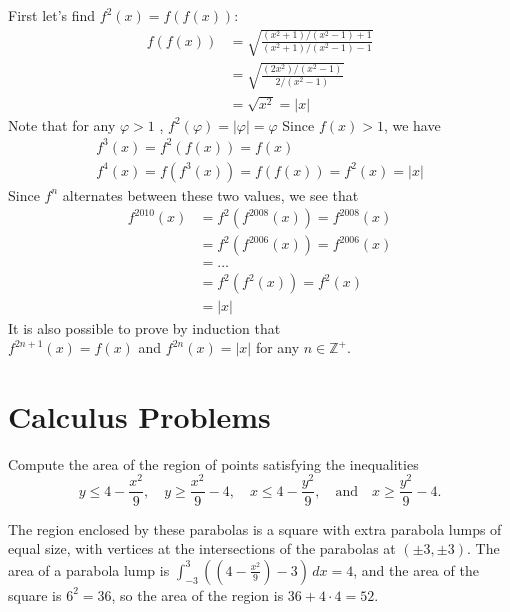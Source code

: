 \documentclass[12pt]{article}
\newcounter{problem}
\begin{document}
\begin{solution}[B]
      First let's find $f^2(x) = f(f(x))$:
      \begin{align*}
         f(f(x)) &= \sqrt{ \frac{ (x^2+1)/(x^2-1)+1 } { (x^2+1)/(x^2-1) -1} } \\
         &= \sqrt{ \frac{ (2x^2)/(x^2-1) }{ 2/(x^2-1) } } \\
         &= \sqrt{x^2} = |x|
      \end{align*}
      Note that for any $\varphi>1$ ,  $f^2(\varphi) = |\varphi| = \varphi$
      Since $f(x)>1$, we have \\
      \begin{align*}
         f^3(x)=f^2(f(x)) = f(x) \\
         f^4(x) = f(f^3(x)) = f(f(x)) = f^2(x) = |x|
      \end{align*}
      Since $f^n$ alternates between these two values, we see that
      \begin{align*}
         f^{2010}(x) &= f^2(f^{2008}(x)) = f^{2008}(x)\\
         &= f^2(f^{2006}(x)) = f^{2006}(x) \\
         &= \ldots \\
         &= f^2(f^2(x)) = f^2(x) \\
         &= \boxed{|x|}
      \end{align*}
      It is also possible to prove by induction that \\
      $f^{2n+1}(x) = f(x)$ and $f^{2n}(x)=|x|$ for any $n \in \mathbb{Z}^{+}$.
\end{solution}

\newpage

\section*{Calculus Problems}

\begin{problem}[D][4][BMT 2021/4]
   Compute the area of the region of points satisfying the inequalities 
\[ y \leq 4 - \frac{x^2}{9}, \quad y \geq \frac{x^2}{9} - 4, \quad x \leq 4 - \frac{y^2}{9}, \quad \text{and} \quad x \geq \frac{y^2}{9} - 4. \]
\end{problem}

\vspace{-1.5cm}

\begin{solution}[52]
   The region enclosed by these parabolas is a square with extra parabola lumps of equal size, with vertices at the intersections of the parabolas at \((\pm 3, \pm 3)\). The area of a parabola lump is \(\int_{-3}^{3} \left( \left(4 - \frac{x^2}{9}\right) - 3 \right) \, dx = 4\), and the area of the square is \(6^2 = 36\), so the area of the region is $36 + 4 \cdot 4 = \boxed{52}$.
\end{solution}
\end{document}
